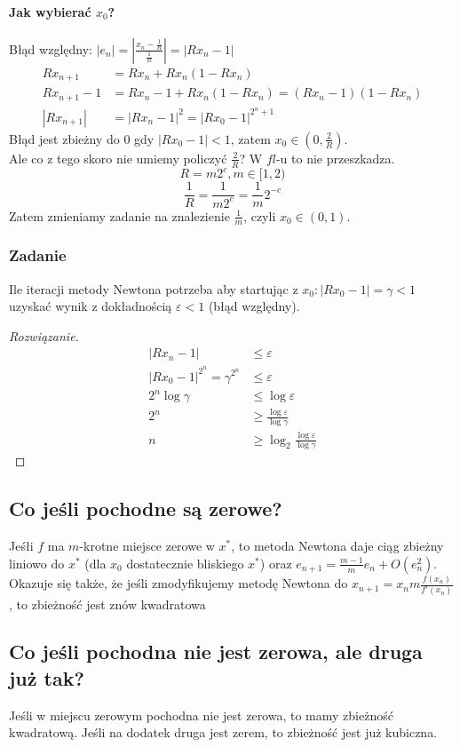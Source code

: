 \documentclass{article}
\begin{document}
\paragraph{Jak wybierać $ x_0 $?}
Błąd względny: $ |e_n|=|\frac{x_n-\frac1R}{\frac1R}|=|Rx_n-1| $
\begin{align*}
	Rx_{n+1}&=Rx_n+Rx_n(1-Rx_n)\\
	Rx_{n+1}-1&=Rx_n-1+Rx_n(1-Rx_n) = (Rx_n-1)(1-Rx_n)\\
	|Rx_{n+1}|&=|Rx_n-1|^2=|Rx_0-1|^{2^n+1}
\end{align*}
Błąd jest zbieżny do 0 gdy $ |Rx_0-1|<1 $, zatem $ x_0\in(0, \frac2R) $.\\
Ale co z tego skoro nie umiemy policzyć $ \frac2R $? W $ fl $-u to nie przeszkadza.
$$ R= m2^c, m\in[1,2)$$
$$\frac1R=\frac1{m2^c}=\frac1m2^{-c}$$
Zatem zmieniamy zadanie na znalezienie $ \frac1m $, czyli $ x_0\in(0,1) $.
\subsubsection{Zadanie}
Ile iteracji metody Newtona potrzeba aby startując z $ x_0:|Rx_0-1|=\gamma<1 $ uzyskać wynik z dokładnością $ \varepsilon<1 $ (błąd względny).
\begin{proof}[Rozwiązanie]
	\begin{align*}
		|Rx_n-1|&\le\varepsilon\\
		|Rx_0-1|^{2^n}=\gamma^{2^n}&\le\varepsilon\\
		2^n\log\gamma&\le\log\varepsilon\\
		2^n&\ge\frac{\log\varepsilon}{\log\gamma}\\
		n&\ge\log_2\frac{\log\varepsilon}{\log\gamma}
	\end{align*}
	
\end{proof}
\subsection{Co jeśli pochodne są zerowe?}
Jeśłi $ f  $ ma $ m $-krotne miejsce zerowe w $ x^* $, to metoda Newtona daje ciąg zbieżny liniowo do $ x^* $ (dla $ x_0 $ dostatecznie bliskiego $ x^* $) oraz $ e_{n+1}=\frac{m-1}{m}e_n+O(e_n^2) $.
Okazuje się także, że jeśli zmodyfikujemy metodę Newtona do $ x_{n+1}=x_nm\frac{f(x_n)}{f'(x_n)} $, to zbieżność jest znów kwadratowa

\subsection{Co jeśli pochodna nie jest zerowa, ale druga już tak?}
Jeśli w miejscu zerowym pochodna nie jest zerowa, to mamy zbieżność kwadratową. Jeśli na dodatek druga jest zerem, to zbieżność jest już kubiczna.
\end{document}
